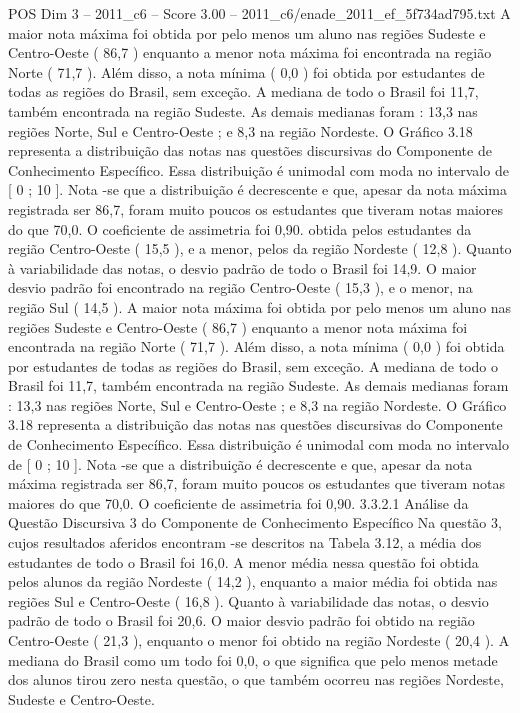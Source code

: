 \begin{textsample}{POS Dim 3 – 2011\_c6 – Score 3.00 – 2011\_c6/enade\_2011\_ef\_5f734ad795.txt}
A maior nota máxima foi obtida por pelo menos um aluno nas regiões Sudeste e Centro-Oeste ( 86,7 ) enquanto a menor nota máxima foi encontrada na região Norte ( 71,7 ).
Além disso, a nota mínima ( 0,0 ) foi obtida por estudantes de todas as regiões do Brasil, sem exceção.
A mediana de todo o Brasil foi 11,7, também encontrada na região Sudeste.
As demais medianas foram : 13,3 nas regiões Norte, Sul e Centro-Oeste ; e 8,3 na região Nordeste.
O Gráfico 3.18 representa a distribuição das notas nas questões discursivas do Componente de Conhecimento Específico.
Essa distribuição é unimodal com moda no intervalo de [ 0 ; 10 ].
Nota -se que a distribuição é decrescente e que, apesar da nota máxima registrada ser 86,7, foram muito poucos os estudantes que tiveram notas maiores do que 70,0.
O coeficiente de assimetria foi 0,90. obtida pelos estudantes da região Centro-Oeste ( 15,5 ), e a menor, pelos da região Nordeste ( 12,8 ).
Quanto à variabilidade das notas, o desvio padrão de todo o Brasil foi 14,9.
O maior desvio padrão foi encontrado na região Centro-Oeste ( 15,3 ), e o menor, na região Sul ( 14,5 ).
A maior nota máxima foi obtida por pelo menos um aluno nas regiões Sudeste e Centro-Oeste ( 86,7 ) enquanto a menor nota máxima foi encontrada na região Norte ( 71,7 ).
Além disso, a nota mínima ( 0,0 ) foi obtida por estudantes de todas as regiões do Brasil, sem exceção.
A mediana de todo o Brasil foi 11,7, também encontrada na região Sudeste.
As demais medianas foram : 13,3 nas regiões Norte, Sul e Centro-Oeste ; e 8,3 na região Nordeste.
O Gráfico 3.18 representa a distribuição das notas nas questões discursivas do Componente de Conhecimento Específico.
Essa distribuição é unimodal com moda no intervalo de [ 0 ; 10 ].
Nota -se que a distribuição é decrescente e que, apesar da nota máxima registrada ser 86,7, foram muito poucos os estudantes que tiveram notas maiores do que 70,0.
O coeficiente de assimetria foi 0,90. 3.3.2.1 Análise da Questão Discursiva 3 do Componente de Conhecimento Específico Na questão 3, cujos resultados aferidos encontram -se descritos na Tabela 3.12, a média dos estudantes de todo o Brasil foi 16,0.
A menor média nessa questão foi obtida pelos alunos da região Nordeste ( 14,2 ), enquanto a maior média foi obtida nas regiões Sul e Centro-Oeste ( 16,8 ).
Quanto à variabilidade das notas, o desvio padrão de todo o Brasil foi 20,6.
O maior desvio padrão foi obtido na região Centro-Oeste ( 21,3 ), enquanto o menor foi obtido na região Nordeste ( 20,4 ).
A mediana do Brasil como um todo foi 0,0, o que significa que pelo menos metade dos alunos tirou zero nesta questão, o que também ocorreu nas regiões Nordeste, Sudeste e Centro-Oeste.

\end{textsample}
